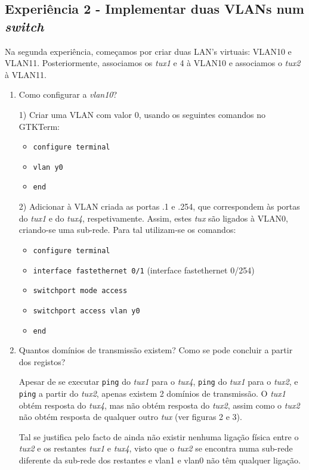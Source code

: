 \documentclass{article}
\begin{document}
\subsection{Experiência 2 - Implementar duas VLANs num \textit{switch}}

Na segunda experiência, começamos por criar duas LAN’s virtuais: VLAN10 e VLAN11. Posteriormente, associamos os \textit{tux1} e 4 à VLAN10 e associamos o \textit{tux2} à VLAN11.

\begin{enumerate}
\item Como configurar a \textit{vlan10}?

1) Criar uma VLAN com valor 0, usando os seguintes comandos no GTKTerm:
\begin{itemize}
    \item \texttt{configure terminal}
    \item \texttt{vlan y0}
    \item \texttt{end}
\end{itemize}
2) Adicionar à VLAN criada as portas .1 e .254, que correspondem às portas do \textit{tux1} e do \textit{tux4}, respetivamente. Assim, estes \textit{tux} são ligados à VLAN0, criando-se uma sub-rede. Para tal utilizam-se os comandos:
\begin{itemize}
    \item \texttt{configure terminal}
    \item \texttt{interface fastethernet 0/1}  (interface fastethernet 0/254)
    \item \texttt{switchport mode access}
    \item \texttt{switchport access vlan y0}
    \item \texttt{end}
\end{itemize}

\item Quantos domínios de transmissão existem? Como se pode concluir a partir dos registos?

Apesar de se executar \texttt{ping} do \textit{tux1} para o \textit{tux4}, \texttt{ping} do \textit{tux1} para o \textit{tux2}, e \texttt{ping} a partir do \textit{tux2}, apenas existem 2 domínios de transmissão. O \textit{tux1} obtém resposta do \textit{tux4}, mas não obtém resposta do \textit{tux2}, assim como o \textit{tux2} não obtém resposta de qualquer outro \textit{tux} (ver figuras 2 e 3). 

Tal se justifica pelo facto de ainda não existir nenhuma ligação física entre o \textit{tux2} e os restantes \textit{tux1} e \textit{tux4}, visto que o \textit{tux2} se encontra numa sub-rede diferente da sub-rede dos restantes e vlan1 e vlan0 não têm qualquer ligação.

\end{enumerate}
\end{document}
